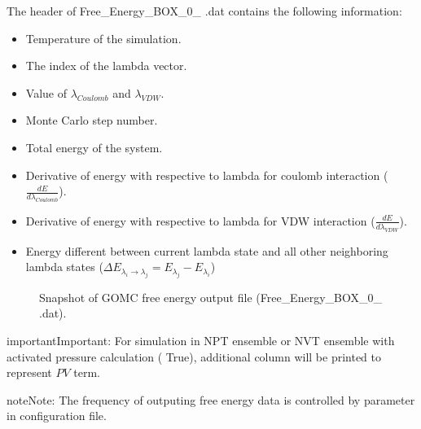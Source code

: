 \documentclass[letterpaper,10pt,english]{sphinxmanual}
\begin{document}
The header of Free\_Energy\_BOX\_0\_ .dat contains the following information:
\begin{itemize}
\item {} 
Temperature of the simulation.

\item {} 
The index of the lambda vector.

\item {} 
Value of \({\lambda}_{Coulomb}\) and \({\lambda}_{VDW}\).

\item {} 
Monte Carlo step number.

\item {} 
Total energy of the system.

\item {} 
Derivative of energy with respective to lambda for coulomb interaction (\(\frac{dE}{d\lambda_{Coulomb}}\)).

\item {} 
Derivative of energy with respective to lambda for VDW interaction (\(\frac{dE}{d\lambda_{VDW}}\)).

\item {} 
Energy different between current lambda state and all other neighboring lambda states
(\(\Delta E_{{\lambda}_i \rightarrow {\lambda}_j} = E_{{\lambda}_j} - E_{{\lambda}_i}\))

\end{itemize}

\begin{figure}[htbp]
\centering
\capstart

\noindent{}
\caption{Snapshot of GOMC free energy output file (Free\_Energy\_BOX\_0\_ .dat).}\label{\detokenize{output_file:id17}}\end{figure}

\begin{sphinxadmonition}{important}{Important:}
For simulation in NPT ensemble or NVT ensemble with activated pressure calculation (   True),
additional column will be printed to represent \(PV\) term.
\end{sphinxadmonition}

\begin{sphinxadmonition}{note}{Note:}
The frequency of outputing free energy data is controlled by  parameter in configuration file.
\end{sphinxadmonition}
\end{document}
